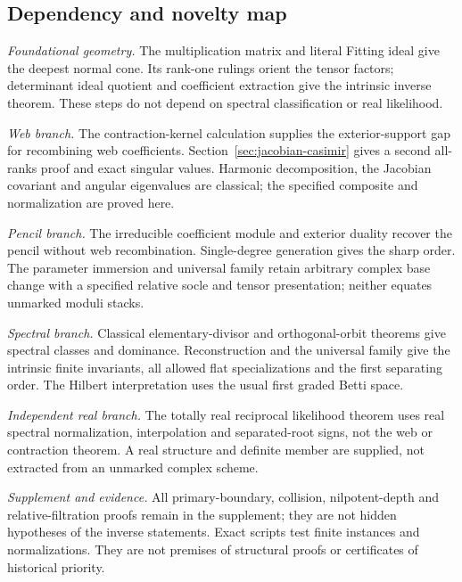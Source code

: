 \subsection{Dependency and novelty map}

\noindent\emph{Foundational geometry.}
The multiplication matrix and literal Fitting ideal give the deepest
normal cone. Its rank-one rulings orient the tensor factors;
determinant ideal quotient and coefficient extraction give the
intrinsic inverse theorem. These steps do not depend on spectral
classification or real likelihood.

\noindent\emph{Web branch.}
The contraction-kernel calculation supplies the exterior-support gap
for recombining web coefficients. Section~\ref{sec:jacobian-casimir}
gives a second all-ranks proof and exact singular values. Harmonic
decomposition, the Jacobian covariant and angular eigenvalues are
classical; the specified composite and normalization are proved here.

\noindent\emph{Pencil branch.}
The irreducible coefficient module and exterior duality recover the
pencil without web recombination. Single-degree generation gives the
sharp order. The parameter immersion and universal family retain
arbitrary complex base change with a specified relative socle and
tensor presentation; neither equates unmarked moduli stacks.

\noindent\emph{Spectral branch.}
Classical elementary-divisor and orthogonal-orbit theorems give
spectral classes and dominance. Reconstruction and the universal
family give the intrinsic finite invariants, all allowed flat
specializations and the first separating order. The Hilbert
interpretation uses the usual first graded Betti space.

\noindent\emph{Independent real branch.}
The totally real reciprocal likelihood theorem uses real spectral
normalization, interpolation and separated-root signs, not the web
or contraction theorem. A real structure and definite member are
supplied, not extracted from an unmarked complex scheme.

\noindent\emph{Supplement and evidence.}
All primary-boundary, collision, nilpotent-depth and relative-filtration
proofs remain in the supplement; they are not hidden hypotheses of
the inverse statements. Exact scripts test finite instances and
normalizations. They are not premises of structural proofs or
certificates of historical priority.
